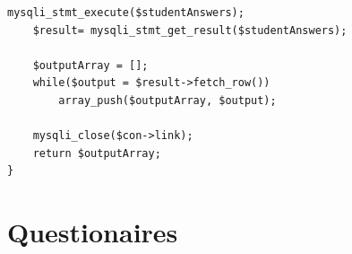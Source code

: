 \documentclass[11pt]{report}
\begin{document}
\begin{appendices}
\begin{lstlisting}[caption= studentLabAnswers Function  - PHP, label = app:result-retrieve]
    mysqli_stmt_execute($studentAnswers);
    $result= mysqli_stmt_get_result($studentAnswers);

    $outputArray = [];
    while($output = $result->fetch_row())
        array_push($outputArray, $output);
    
    mysqli_close($con->link);
    return $outputArray;
}
\end{lstlisting} \doublespacing





\chapter{Questionaires}

 


 



\end{appendices}
\end{document}
